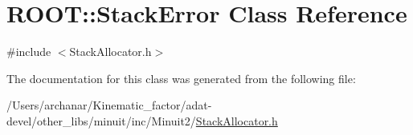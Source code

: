 \hypertarget{classROOT_1_1Minuit2_1_1StackError}{}\section{R\+O\+OT\+:\+:Stack\+Error Class Reference}
\label{classROOT_1_1Minuit2_1_1StackError}


{\ttfamily \#include $<$Stack\+Allocator.\+h$>$}



The documentation for this class was generated from the following file\+:\begin{DoxyCompactItemize}
\item 
/\+Users/archanar/\+Kinematic\+\_\+factor/adat-\/devel/other\+\_\+libs/minuit/inc/\+Minuit2/\mbox{\hyperlink{adat-devel_2other__libs_2minuit_2inc_2Minuit2_2StackAllocator_8h}{Stack\+Allocator.\+h}}\end{DoxyCompactItemize}
